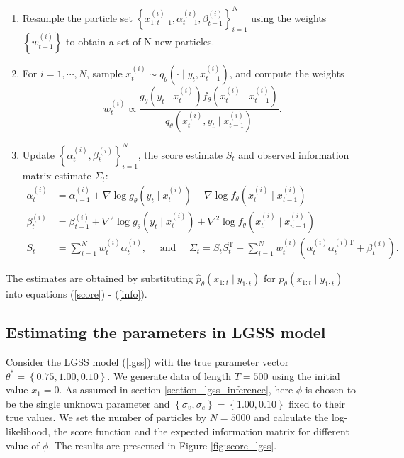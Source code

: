 \documentclass[mstat,12pt]{unswthesis}  %
\numberwithin{equation}{section}
\begin{document}
\begin{enumerate}
    \item Resample the particle set $\left\{x_{1: t-1}^{(i)}, \alpha_{t-1}^{(i)}, \beta_{t-1}^{(i)}\right\}_{i=1}^{N}$ using the weights
    $\left\{w_{t-1}^{(i)}\right\}$ to obtain a set of N new particles.
    \item For $i =1, \cdots , N$, sample $x_{t}^{(i)} \sim q_{\theta}\left(\cdot \mid y_{t}, x_{t-1}^{(i)}\right)$, and compute the weights
    \begin{equation}w_{t}^{(i)} \propto \frac{g_{\theta}\left(y_{t} \mid x_{t}^{(i)}\right) f_{\theta}\left(x_{t}^{(i)} \mid x_{t-1}^{(i)}\right)}{q_{\theta}\left(x_{t}^{(i)}, y_{t} \mid x_{t-1}^{(i)}\right)}.\end{equation}
    \item Update $\left\{\alpha_{t}^{(i)}, \beta_{t}^{(i)}\right\}_{i=1}^{N}$, the score estimate $S_{t}$ and observed information matrix estimate $\Sigma_{t}$:
    \begin{equation}\begin{aligned}
\alpha_{t}^{(i)} &=\alpha_{t-1}^{(i)}+\nabla \log g_{\theta}\left(y_{t} \mid x_{t}^{(i)}\right)+\nabla \log f_{\theta}\left(x_{t}^{(i)} \mid x_{t-1}^{(i)}\right) \\
\beta_{t}^{(i)} &=\beta_{t-1}^{(i)}+\nabla^{2} \log g_{\theta}\left(y_{t} \mid x_{t}^{(i)}\right)+\nabla^{2} \log f_{\theta}\left(x_{t}^{(i)} \mid x_{n-1}^{(i)}\right) \\
S_{t} &=\sum_{i=1}^{N} w_{t}^{(i)} \alpha_{t}^{(i)}, \quad \text { and } \quad \Sigma_{t}=S_{t} S_{t}^{\mathrm{T}}-\sum_{i=1}^{N} w_{t}^{(i)}\left(\alpha_{t}^{(i)} \alpha_{t}^{(i) \mathrm{T}}+\beta_{t}^{(i)}\right).
\end{aligned}\end{equation}
\end{enumerate}
The estimates are obtained by  substituting $\hat{p}_{\theta}\left(x_{1:t} \mid y_{1: t}\right)$ for $p_{\theta}\left(x_{1:t} \mid y_{1: t}\right)$ into equations
(\ref{score}) - (\ref{info}).\\

\subsection{Estimating the parameters in LGSS model}
Consider the LGSS model (\ref{lgss}) with the true parameter vector $\theta^{*}=\left\{0.75,1.00,0.10\right\}$.
We generate data of length $T = 500$ using the initial value $x_{1} = 0$. As assumed in section \ref{section_lgss_inference}, here $\phi$ is chosen to be the single unknown parameter and 
$\left\{\sigma_{v}, \sigma_{e}\right\}=\left\{1.00,0.10\right\}$ fixed to
their true values.
We set the  number  of  particles  by $N=  5000$ and calculate the log-likelihood, the score function and the expected information
matrix for different value of $\phi$.
The results are presented in Figure \ref{fig:score_lgss}.\\
\end{document}
